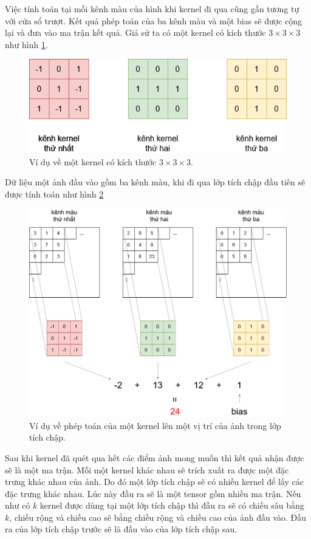 Việc tính toán tại mỗi kênh màu của hình khi kernel đi qua cũng gần tương tự với cửa sổ trượt. Kết quả phép toán của ba kênh màu và một bias sẽ được cộng lại và đưa vào ma trận kết quả. Giả sử ta có một kernel có kích thước $3 \times 3 \times 3$ như hình \ref{fig:kernel}.
\begin{figure}[ht!]
	\centerline{\includegraphics[scale=0.6]{images/kernel.png}}
  	\caption{Ví dụ về một kernel có kích thước $3 \times 3 \times 3$.}
  	\label{fig:kernel}
\end{figure}
Dữ liệu một ảnh đầu vào gồm ba kênh màu, khi đi qua lớp tích chập đầu tiên sẽ được tính toán như hình \ref{fig:kernel_calculation}
\begin{figure}[ht!]
	\centerline{\includegraphics[scale=0.4]{images/kernel_calculation.png}}
  	\caption{Ví dụ về phép toán của một kernel lên một vị trí của ảnh trong lớp tích chập.}
  	\label{fig:kernel_calculation}
\end{figure}
Sau khi kernel đã quét qua hết các điểm ảnh mong muốn thì kết quả nhận được sẽ là một ma trận. Mỗi một kernel khác nhau sẽ trích xuất ra được một đặc trưng khác nhau của ảnh. Do đó một lớp tích chập sẽ có nhiều kernel để lấy các đặc trưng khác nhau. Lúc này đầu ra sẽ là một tensor gồm nhiều ma trận. Nếu như có $k$ kernel được dùng tại một lớp tích chập thì đầu ra sẽ có chiều sâu bằng $k$, chiều rộng và chiều cao sẽ bằng chiều rộng và chiều cao của ảnh đầu vào. Đầu ra của lớp tích chập trước sẽ là đầu vào của lớp tích chập sau.
